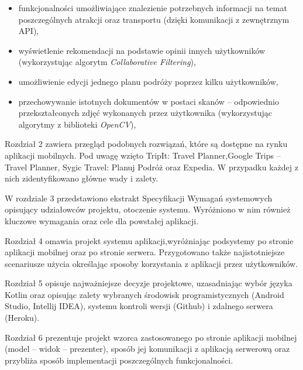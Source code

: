\begin{itemize}

\item funkcjonalności umożliwiające znalezienie potrzebnych informacji na temat poszczególnych atrakcji oraz transportu (dzięki komunikacji z zewnętrznym API),

\item  wyświetlenie rekomendacji na podstawie opinii innych użytkowników (wykorzystując algorytm \textit{Collaborative Filtering}),

\item umożliwienie edycji jednego planu podróży poprzez kilku użytkowników,

\item przechowywanie istotnych dokumentów w postaci skanów – odpowiednio przekształconych zdjęć wykonanych przez użytkownika (wykorzystując algorytmy z biblioteki \textit{OpenCV}),

\end{itemize}

\par Rozdział 2 zawiera przegląd podobnych rozwiązań, które są dostępne na rynku aplikacji mobilnych. Pod uwagę wzięto TripIt: Travel Planner,Google Trips -- Travel Planner, Sygic Travel: Planuj Podróż oraz Expedia. W przypadku każdej z nich zidentyfikowano główne wady i zalety.

\par W rozdziale 3 przedstawiono ekstrakt Specyfikacji Wymagań systemowych opisujący udziałowców projektu, otoczenie systemu. Wyróżniono w nim również kluczowe wymagania oraz cele dla powstałej aplikacji.

\par Rozdział 4 omawia projekt systemu aplikacji,wyróżniając podsystemy po stronie aplikacji mobilnej oraz po stronie serwera. Przygotowano także najistotniejsze scenariusze użycia określając sposoby korzystania z aplikacji przez użytkowników.

\par Rozdział 5 opisuje najważniejsze decyzje projektowe, uzasadniając wybór języka Kotlin oraz opisując zalety wybranych środowisk programistycznych (Android Studio, Intellij IDEA), systemu kontroli wersji (Github) i zdalnego serwera (Heroku). 

\par Rozdział 6 prezentuje projekt wzorca zastosowanego po stronie aplikacji mobilnej (model -- widok -- prezenter), sposób jej komunikacji z aplikacją serwerową oraz przybliża sposób implementacji poszczególnych funkcjonalności.

